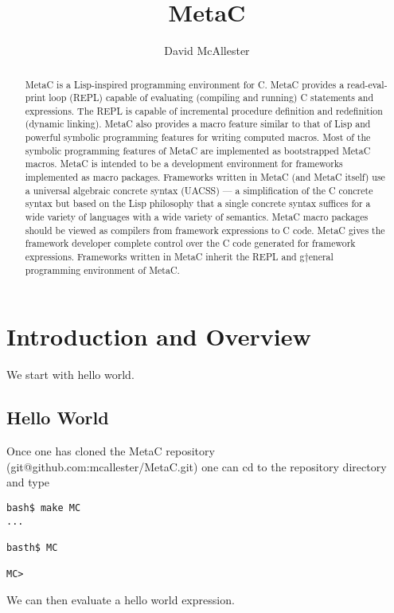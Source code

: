 \documentclass{article}
\title{MetaC}
\author{David McAllester}
\begin{document}
\maketitle

\begin{abstract}
  MetaC is a Lisp-inspired programming environment for C. MetaC provides a read-eval-print loop (REPL) capable of evaluating (compiling and running)
  C statements and expressions.  The REPL is capable of incremental procedure definition and redefinition (dynamic linking).  MetaC also provides
  a macro feature similar to that of Lisp and powerful symbolic programming features for writing computed macros.  Most of the symbolic programming features of
  MetaC are implemented as bootstrapped MetaC macros.  MetaC is intended to be a development environment for frameworks implemented as
  macro packages. Frameworks written in MetaC (and MetaC itself) use a universal algebraic concrete syntax (UACSS) ---
  a simplification of the C concrete syntax but based on the Lisp philosophy that a single concrete syntax suffices for a wide variety of languages with
  a wide variety of semantics.  MetaC macro packages
  should be viewed as compilers from framework expressions to C code.  MetaC gives the framework developer complete control over the C code
  generated for framework expressions.  Frameworks written in MetaC inherit the REPL and g†eneral programming environment of MetaC.
\end{abstract}

\section{Introduction and Overview}

We start with hello world.

\subsection{Hello World}

Once one has cloned the MetaC repository (git@github.com:mcallester/MetaC.git) one can cd to the repository directory and type 

\begin{verbatim}
bash$ make MC
...

basth$ MC

MC>
\end{verbatim}

We can then evaluate a hello world expression.
\end{document}
